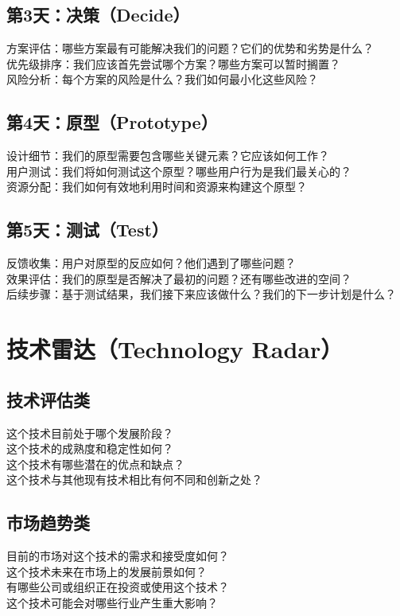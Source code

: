 \documentclass[12pt]{book}
\begin{document}
\subsection{第3天：决策（Decide）}
方案评估：哪些方案最有可能解决我们的问题？它们的优势和劣势是什么？\\
优先级排序：我们应该首先尝试哪个方案？哪些方案可以暂时搁置？\\
风险分析：每个方案的风险是什么？我们如何最小化这些风险？\\

\subsection{第4天：原型（Prototype）}
设计细节：我们的原型需要包含哪些关键元素？它应该如何工作？\\
用户测试：我们将如何测试这个原型？哪些用户行为是我们最关心的？\\
资源分配：我们如何有效地利用时间和资源来构建这个原型？\\

\subsection{第5天：测试（Test）}
反馈收集：用户对原型的反应如何？他们遇到了哪些问题？\\
效果评估：我们的原型是否解决了最初的问题？还有哪些改进的空间？\\
后续步骤：基于测试结果，我们接下来应该做什么？我们的下一步计划是什么？\\



\section{技术雷达（Technology Radar）}
\subsection{技术评估类}
这个技术目前处于哪个发展阶段？\\
这个技术的成熟度和稳定性如何？\\
这个技术有哪些潜在的优点和缺点？\\
这个技术与其他现有技术相比有何不同和创新之处？\\

\subsection{市场趋势类}
目前的市场对这个技术的需求和接受度如何？\\
这个技术未来在市场上的发展前景如何？\\
有哪些公司或组织正在投资或使用这个技术？\\
这个技术可能会对哪些行业产生重大影响？\\
\end{document}
